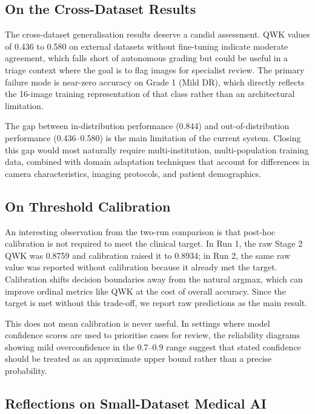 \documentclass[12pt,a4paper]{article}
\begin{document}
\subsection{On the Cross-Dataset Results}

The cross-dataset generalisation results deserve a candid assessment. QWK values of 0.436 to 0.580 on external datasets without fine-tuning indicate moderate agreement, which falls short of autonomous grading but could be useful in a triage context where the goal is to flag images for specialist review. The primary failure mode is near-zero accuracy on Grade 1 (Mild DR), which directly reflects the 16-image training representation of that class rather than an architectural limitation.

The gap between in-distribution performance (0.844) and out-of-distribution performance (0.436--0.580) is the main limitation of the current system. Closing this gap would most naturally require multi-institution, multi-population training data, combined with domain adaptation techniques that account for differences in camera characteristics, imaging protocols, and patient demographics.

\subsection{On Threshold Calibration}

An interesting observation from the two-run comparison is that post-hoc calibration is not required to meet the clinical target. In Run 1, the raw Stage 2 QWK was 0.8759 and calibration raised it to 0.8934; in Run 2, the same raw value was reported without calibration because it already met the target. Calibration shifts decision boundaries away from the natural argmax, which can improve ordinal metrics like QWK at the cost of overall accuracy. Since the target is met without this trade-off, we report raw predictions as the main result.

This does not mean calibration is never useful. In settings where model confidence scores are used to prioritise cases for review, the reliability diagrams showing mild overconfidence in the 0.7--0.9 range suggest that stated confidence should be treated as an approximate upper bound rather than a precise probability.

\subsection{Reflections on Small-Dataset Medical AI}
\end{document}
